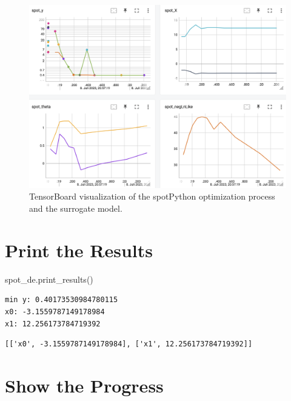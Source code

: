 \documentclass[
  letterpaper,
  DIV=11,
  numbers=noendperiod]{scrreprt}
\newenvironment{Shaded}{\begin{snugshade}}{\end{snugshade}}
\newcommand{\NormalTok}[1]{\textcolor[rgb]{0.00,0.23,0.31}{#1}}
\begin{document}
\begin{figure}

{\centering \includegraphics[width=1\textwidth,height=\textheight]{figures_static/05_tensorboard_01.png}

}

\caption{TensorBoard visualization of the spotPython optimization
process and the surrogate model.}

\end{figure}

\hypertarget{print-the-results}{%
\section{Print the Results}\label{print-the-results}}

\begin{Shaded}
\begin{Highlighting}[]
\NormalTok{spot\_de.print\_results()}
\end{Highlighting}
\end{Shaded}

\begin{verbatim}
min y: 0.40173530984780115
x0: -3.1559787149178984
x1: 12.256173784719392
\end{verbatim}

\begin{verbatim}
[['x0', -3.1559787149178984], ['x1', 12.256173784719392]]
\end{verbatim}

\hypertarget{show-the-progress}{%
\section{Show the Progress}\label{show-the-progress}}
\end{document}

